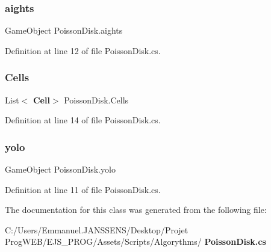 \subsubsection{aights}
{\footnotesize\ttfamily Game\+Object Poisson\+Disk.\+aights}



Definition at line 12 of file Poisson\+Disk.\+cs.

\mbox{\label{class_poisson_disk_a513edb6cb88ca7fc9f9578ef594cbed0}} 
\subsubsection{Cells}
{\footnotesize\ttfamily List$<$\textbf{ Cell}$>$ Poisson\+Disk.\+Cells}



Definition at line 14 of file Poisson\+Disk.\+cs.

\mbox{\label{class_poisson_disk_a668a05ad9606460e28a33be494038b81}} 
\subsubsection{yolo}
{\footnotesize\ttfamily Game\+Object Poisson\+Disk.\+yolo}



Definition at line 11 of file Poisson\+Disk.\+cs.



The documentation for this class was generated from the following file\+:\begin{DoxyCompactItemize}
\item 
C\+:/\+Users/\+Emmanuel.\+J\+A\+N\+S\+S\+E\+N\+S/\+Desktop/\+Projet Prog\+W\+E\+B/\+E\+J\+S\+\_\+\+P\+R\+O\+G/\+Assets/\+Scripts/\+Algorythms/\textbf{ Poisson\+Disk.\+cs}\end{DoxyCompactItemize}
